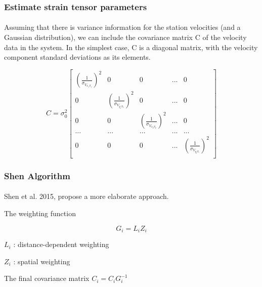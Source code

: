 \begin{frame}
 \frametitle{Estimate strain tensor parameters}
 \framesubtitle{}
 \label{ch2:}
 
 Assuming that there is variance information for the station velocities (and a Gaussian distribution), we can include the covariance matrix C  of the velocity data in the system. In the simplest case, C is a diagonal matrix, with the velocity component standard deviations as its elements.
 
 \[
 C = \sigma_{0}^{2} 
 \begin{bmatrix}
 (\frac{1}{\sigma_{V_{x_{1}S_{1}}}})^{2} & 0 & 0  & ... & 0\\
 0 & (\frac{1}{\sigma_{V_{y_{1}S_{1}}}})^{2} & 0  & ... & 0\\
 0 & 0 & ({\frac{1}{\sigma_{V_{x_{2}S_{2}}}}})^{2} & ... & 0\\
 ... &  ... & ... & ... & ...\\
 0 & 0 & 0 & ... & (\frac{1}{\sigma_{V_{y_{i}S_{i}}}})^{2}\\
 \end{bmatrix}
 \]

\end{frame}
\note{}


\begin{frame}
 \frametitle{Shen Algorithm}
 \framesubtitle{}
 \label{ch2:}
 
 Shen et al. 2015, propose a more elaborate approach.
 
 The weighting function
 
 \[ G_{i} = L_{i} Z_{i}  \]
 
 $ L_{i} $ : distance-dependent weighting
 
 $ Z_{i} $ : spatial weighting
 
 The final covariance matrix $ C_{i} = C_{i}G_{i}^{-1} $

\end{frame}
\note{}

